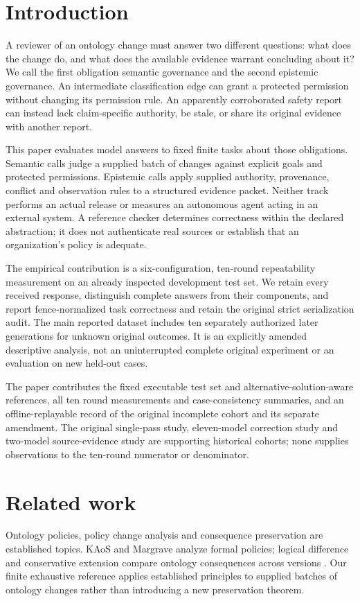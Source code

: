 \documentclass[a4paper,preprint,12pt,numbers,nopreprintline]{elsarticle}
\begin{document}
\section{Introduction}
A reviewer of an ontology change must answer two different questions: what does the change do, and what does the available evidence warrant concluding about it? We call the first obligation semantic governance and the second epistemic governance. An intermediate classification edge can grant a protected permission without changing its permission rule. An apparently corroborated safety report can instead lack claim-specific authority, be stale, or share its original evidence with another report.

This paper evaluates model answers to fixed finite tasks about those obligations. Semantic calls judge a supplied batch of changes against explicit goals and protected permissions. Epistemic calls apply supplied authority, provenance, conflict and observation rules to a structured evidence packet. Neither track performs an actual release or measures an autonomous agent acting in an external system. A reference checker determines correctness within the declared abstraction; it does not authenticate real sources or establish that an organization's policy is adequate.

The empirical contribution is a six-configuration, ten-round repeatability measurement on an already inspected development test set. We retain every received response, distinguish complete answers from their components, and report fence-normalized task correctness and retain the original strict serialization audit. The main reported dataset includes ten separately authorized later generations for unknown original outcomes. It is an explicitly amended descriptive analysis, not an uninterrupted complete original experiment or an evaluation on new held-out cases.

The paper contributes the fixed executable test set and alternative-solution-aware references, all ten round measurements and case-consistency summaries, and an offline-replayable record of the original incomplete cohort and its separate amendment. The original single-pass study, eleven-model correction study and two-model source-evidence study are supporting historical cohorts; none supplies observations to the ten-round numerator or denominator.
\section{Related work}
Ontology policies, policy change analysis and consequence preservation are established topics. KAoS and Margrave analyze formal policies; logical difference and conservative extension compare ontology consequences across versions \citep{kaos,margrave,logicaldiff,survey}. Our finite exhaustive reference applies established principles to supplied batches of ontology changes rather than introducing a new preservation theorem.
\end{document}
